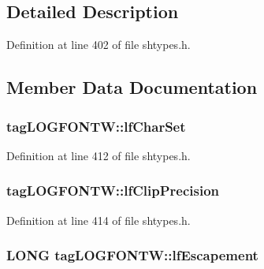 \subsection{Detailed Description}


Definition at line 402 of file shtypes.\+h.



\subsection{Member Data Documentation}
\subsubsection[{\texorpdfstring{lf\+Char\+Set}{lfCharSet}}]{ tag\+L\+O\+G\+F\+O\+N\+T\+W\+::lf\+Char\+Set}\hypertarget{structtag_l_o_g_f_o_n_t_w_a48dfa89b5878c4424efde9d47a7273c9}{}\label{structtag_l_o_g_f_o_n_t_w_a48dfa89b5878c4424efde9d47a7273c9}


Definition at line 412 of file shtypes.\+h.

\subsubsection[{\texorpdfstring{lf\+Clip\+Precision}{lfClipPrecision}}]{ tag\+L\+O\+G\+F\+O\+N\+T\+W\+::lf\+Clip\+Precision}\hypertarget{structtag_l_o_g_f_o_n_t_w_ad46dd44f98e2b0beeab12afab51f2778}{}\label{structtag_l_o_g_f_o_n_t_w_ad46dd44f98e2b0beeab12afab51f2778}


Definition at line 414 of file shtypes.\+h.

\subsubsection[{\texorpdfstring{lf\+Escapement}{lfEscapement}}]{\setlength{\rightskip}{0pt plus 5cm}L\+O\+NG tag\+L\+O\+G\+F\+O\+N\+T\+W\+::lf\+Escapement}\hypertarget{structtag_l_o_g_f_o_n_t_w_ae3bec8c800604c75eb33acd84f4c7491}{}\label{structtag_l_o_g_f_o_n_t_w_ae3bec8c800604c75eb33acd84f4c7491}


